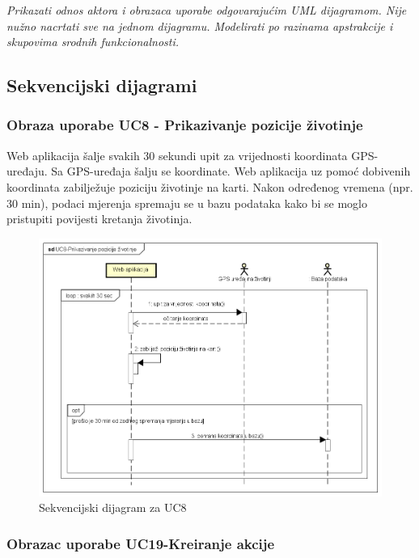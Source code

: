 					\textit{Prikazati odnos aktora i obrazaca uporabe odgovarajućim UML dijagramom. Nije nužno nacrtati sve na jednom dijagramu. Modelirati po razinama apstrakcije i skupovima srodnih funkcionalnosti.}
				\eject		
				
			\subsection{Sekvencijski dijagrami}
			
			\subsubsection{Obraza uporabe UC8 - Prikazivanje pozicije životinje}
			
			Web aplikacija šalje svakih 30 sekundi upit za vrijednosti koordinata GPS-uređaju. Sa GPS-uređaja
			šalju se koordinate. Web aplikacija uz pomoć dobivenih koordinata zabilježuje
			poziciju životinje na karti. Nakon određenog vremena (npr. 30 min), podaci
			mjerenja spremaju se u bazu podataka kako bi se moglo pristupiti povijesti
			kretanja životinja.
			
			\begin{figure}[H]
				\includegraphics[width=\textwidth]{slike/Sekvencijski_dijagram_za_UC8.PNG} %
				\caption{Sekvencijski dijagram za UC8}
				\label{fig:Sekvencijski_dijagram_za_UC8} %
			\end{figure}
				
				\subsubsection{Obrazac uporabe UC19-Kreiranje akcije}
				
